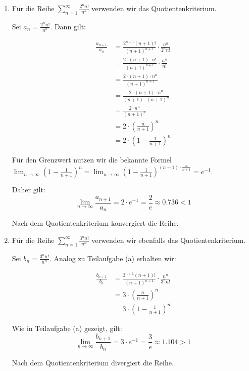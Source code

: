 \documentclass{article}
\begin{document}
\begin{enumerate}[label=(\alph*)]

\item Für die Reihe $\displaystyle \sum_{n=1}^\infty \frac{2^n n!}{n^n}$ verwenden wir das Quotientenkriterium.

Sei $a_n = \frac{2^n n!}{n^n}$. Dann gilt:

\begin{align}
\frac{a_{n+1}}{a_n} &= \frac{2^{n+1} (n+1)!}{(n+1)^{n+1}} \cdot \frac{n^n}{2^n n!}\\
&= \frac{2 \cdot (n+1) \cdot n!}{(n+1)^{n+1}} \cdot \frac{n^n}{n!}\\
&= \frac{2 \cdot (n+1) \cdot n^n}{(n+1)^{n+1}}\\
&= \frac{2 \cdot (n+1) \cdot n^n}{(n+1) \cdot (n+1)^n}\\
&= \frac{2 \cdot n^n}{(n+1)^n}\\
&= 2 \cdot \left(\frac{n}{n+1}\right)^n\\
&= 2 \cdot \left(1 - \frac{1}{n+1}\right)^n
\end{align}

Für den Grenzwert nutzen wir die bekannte Formel $\lim_{n \to \infty} \left(1 - \frac{1}{n+1}\right)^n = \lim_{n \to \infty} \left(1 - \frac{1}{n+1}\right)^{(n+1) \cdot \frac{n}{n+1}} = e^{-1}$.

Daher gilt:
$$\lim_{n \to \infty} \frac{a_{n+1}}{a_n} = 2 \cdot e^{-1} = \frac{2}{e} \approx 0.736 < 1$$

Nach dem Quotientenkriterium konvergiert die Reihe.

\item Für die Reihe $\displaystyle \sum_{n=1}^\infty \frac{3^n n!}{n^n}$ verwenden wir ebenfalls das Quotientenkriterium.

Sei $b_n = \frac{3^n n!}{n^n}$. Analog zu Teilaufgabe (a) erhalten wir:

\begin{align}
\frac{b_{n+1}}{b_n} &= \frac{3^{n+1} (n+1)!}{(n+1)^{n+1}} \cdot \frac{n^n}{3^n n!}\\
&= 3 \cdot \left(\frac{n}{n+1}\right)^n\\
&= 3 \cdot \left(1 - \frac{1}{n+1}\right)^n
\end{align}

Wie in Teilaufgabe (a) gezeigt, gilt:
$$\lim_{n \to \infty} \frac{b_{n+1}}{b_n} = 3 \cdot e^{-1} = \frac{3}{e} \approx 1.104 > 1$$

Nach dem Quotientenkriterium divergiert die Reihe.


\end{enumerate}
\end{document}
